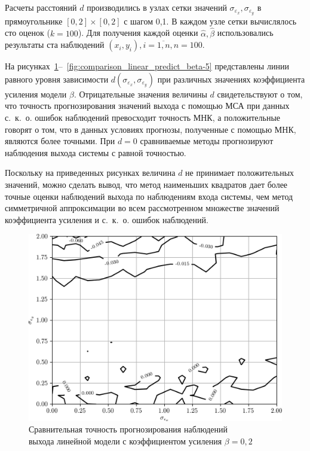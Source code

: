 Расчеты расстояний \( d \) производились в узлах сетки значений
\( \sigma_{\varepsilon_x}, \sigma_{\varepsilon_y} \) в прямоугольнике
\( [0, 2] \times [0, 2] \) с шагом 0{,}1.
В каждом узле сетки вычислялось сто оценок (\( k = 100 \)).
Для получения каждой оценки \( \hat{\alpha}, \hat{\beta} \) использовались результаты
ста наблюдений \( ( x_i, y_i ), i = \overline{1, n}, n = 100 \).

На рисунках~\ref{fig:comparison_linear_predict_beta-0,2}--~\ref{fig:comparison_linear_predict_beta-5}
представлены линии равного уровня зависимости \( d(\sigma_{\varepsilon_x}, \sigma_{\varepsilon_y}) \)
при различных значениях коэффициента усиления модели \( \beta \).
Отрицательные значения величины \( d \) свидетельствуют о том,
что точность прогнозирования значений выхода с помощью МСА при данных с.~к.~о.
ошибок наблюдений превосходит точность МНК,
а положительные говорят о том, что в данных условиях прогнозы, полученные с помощью МНК,
являются более точными.
При \( d = 0 \) сравниваемые методы прогнозируют наблюдения выхода системы с
равной точностью.

Поскольку на приведенных рисунках величина \( d \) не принимает положительных значений,
можно сделать вывод, что метод наименьших квадратов дает более точные оценки
наблюдений выхода по наблюдениям входа системы, чем метод симметричной аппроксимации
во всем рассмотренном множестве значений коэффициента усиления и с.~к.~о. ошибок наблюдений.

\begin{figure}[h]
  \centering
  \includegraphics[width=135mm]{fig/linear/predict/beta-0,2_predict-measured.png}
  \caption{%
    Сравнительная точность прогнозирования наблюдений \\
    выхода линейной модели с коэффициентом усиления \( \beta = 0{,}2 \)
  }\label{fig:comparison_linear_predict_beta-0,2}
\end{figure}

